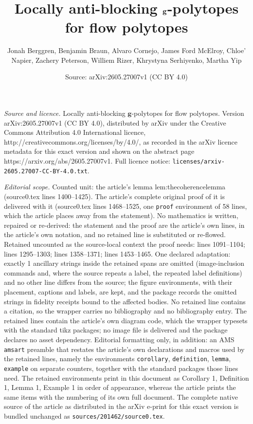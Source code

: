 \documentclass[10pt,a4paper]{amsart}
\title{Locally anti-blocking $\bg$-polytopes for flow polytopes}
\author{Jonah Berggren, Benjamin Braun, Alvaro Cornejo, James Ford McElroy, Chloe' Napier, Zachery Peterson, Williem Rizer, Khrystyna Serhiyenko, Martha Yip}
\date{Source: arXiv:2605.27007v1 (CC BY 4.0)}
\newcommand\bg{\mathbf{g}}
\begin{document}
\maketitle

\noindent\emph{Source and licence.} Locally anti-blocking $\bg$-polytopes for flow polytopes. Version arXiv:2605.27007v1 (CC BY 4.0), distributed by arXiv under the Creative Commons Attribution 4.0 International licence, http://creativecommons.org/licenses/by/4.0/, as recorded in the arXiv licence metadata for this exact version and shown on the abstract page https://arxiv.org/abs/2605.27007v1. Full licence notice: \texttt{licenses/arxiv-2605.27007-CC-BY-4.0.txt}.\par\smallskip

\noindent\textit{Editorial scope.} Counted unit: the article's lemma lem:thecoherencelemma (source0.tex lines 1400--1425). The article's complete original proof of it is delivered with it (source0.tex lines 1468--1525, one \texttt{proof} environment of 58 lines, which the article places away from the statement). No mathematics is written, repaired or re-derived: the statement and the proof are the article's own lines, in the article's own notation, and no retained line is substituted or re-flowed.  Retained uncounted as the source-local context the proof needs: lines 1091--1104; lines 1295--1303; lines 1358--1371; lines 1453--1465.  One declared adaptation: exactly 1 ancillary strings inside the retained spans are omitted (image-inclusion commands and, where the source repeats a label, the repeated label definitions) and no other line differs from the source; the figure environments, with their placement, captions and labels, are kept, and the package records the omitted strings in fidelity receipts bound to the affected bodies.  No retained line contains a citation, so the wrapper carries no bibliography and no bibliography entry.  The retained lines contain the article's own diagram code, which the wrapper typesets with the standard tikz packages; no image file is delivered and the package declares no asset dependency.  Editorial formatting only, in addition: an AMS \texttt{amsart} preamble that restates the article's own declarations and macros used by the retained lines, namely the environments \texttt{corollary}, \texttt{definition}, \texttt{lemma}, \texttt{example} on separate counters, together with the standard packages those lines need.  The retained environments print in this document as Corollary 1, Definition 1, Lemma 1, Example 1 in order of appearance, whereas the article prints the same items with the numbering of its own full document.  The complete native source of the article as distributed in the arXiv e-print for this exact version is bundled unchanged as \texttt{sources/201462/source0.tex}.
\end{document}
